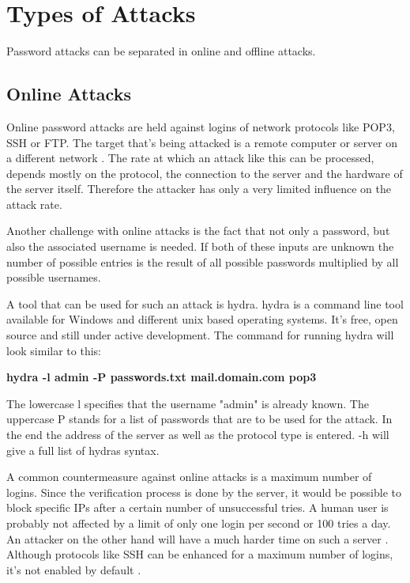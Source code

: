 \section{Types of Attacks}

Password attacks can be separated in online and offline attacks.

\subsection{Online Attacks}

Online password attacks are held against logins of network protocols like POP3, SSH or FTP. The target that's being attacked is a remote computer or server on a different network \cite{pentesting}. The rate at which an attack like this can be processed, depends mostly on the protocol, the connection to the server and the hardware of the server itself. Therefore the attacker has only a very limited influence on the attack rate.

Another challenge with online attacks is the fact that not only a password, but also the associated username is needed. If both of these inputs are unknown the number of possible entries is the result of all possible passwords multiplied by all possible usernames.

A tool that can be used for such an attack is hydra. hydra is a command line tool available for Windows and different unix based operating systems. It's free, open source and still under active development. The command for running hydra will look similar to this:

\begin{center}
\textbf{hydra -l admin -P passwords.txt mail.domain.com pop3}
\end{center}

The lowercase l specifies that the username "admin" is already known. The uppercase P stands for a list of passwords that are to be used for the attack. In the end the address of the server as well as the protocol type is entered. -h will give a full list of hydras syntax.

A common countermeasure against online attacks is a maximum number of logins. Since the verification process is done by the server, it would be possible to block specific IPs after a certain number of unsuccessful tries. A human user is probably not affected by a limit of only one login per second or 100 tries a day. An attacker on the other hand will have a much harder time on such a server \cite{anders}. Although protocols like SSH can be enhanced for a maximum number of logins, it's not enabled by default \cite{sshmanpages}.

